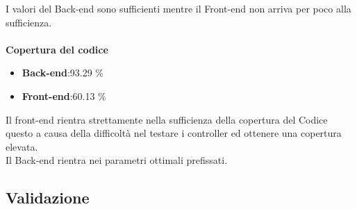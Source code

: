 I valori del Back-end sono sufficienti mentre il Front-end non arriva per poco alla sufficienza.
\\\\
\textbf{Copertura del codice}
\begin{itemize}
\item \textbf{Back-end}:93.29 \%
\item \textbf{Front-end}:60.13 \%
\end{itemize}
Il front-end rientra strettamente nella sufficienza della copertura del Codice questo a causa della difficoltà nel testare i controller ed ottenere una copertura elevata.\\
Il Back-end rientra nei parametri ottimali prefissati.

\subsection{Validazione}

